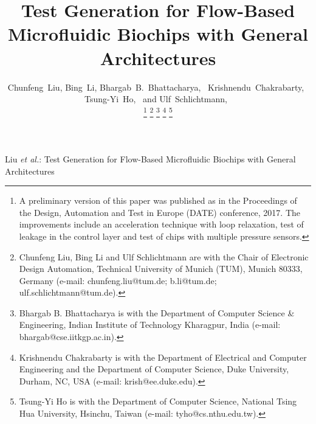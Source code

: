 \documentclass[journal,twoside]{IEEEtran}
\begin{document}
\graphicspath{{Fig/}}
\def\figname{Fig.}
\def\algname{Algorithm}
\newcommand{\figurefontsize}{\footnotesize}
\newcommand{\papertitle}{Test Generation for Flow-Based Microfluidic
Biochips with General Architectures}
\newcommand{\tum}{Technical University of Munich (TUM)}



\title{\papertitle}

\author{	
Chunfeng~Liu, Bing~Li, Bhargab~B.~Bhattacharya,~ Krishnendu~Chakrabarty,~
Tsung-Yi~Ho,~ and Ulf~Schlichtmann,~

\thanks{A preliminary version of this paper was published as \cite{CBBK17} in
the Proceedings of the Design, Automation and Test in Europe (DATE)
conference, 2017. The improvements include an acceleration technique with loop
relaxation, test of leakage in the control layer and test of chips with multiple
pressure sensors.}
          \thanks{Chunfeng Liu, Bing Li and Ulf Schlichtmann are with the Chair
	    of Electronic Design Automation,
          \tum, Munich 80333, Germany (e-mail: chunfeng.liu@tum.de; b.li@tum.de;
  ulf.schlichtmann@tum.de).}
  \thanks{Bhargab B. Bhattacharya is with the
    Department of Computer Science \& Engineering, Indian Institute of
    Technology Kharagpur, India (e-mail: bhargab@cse.iitkgp.ac.in).}
           \thanks{Krishnendu Chakrabarty is with the Department of 
	     Electrical and Computer Engineering and the Department of Computer
	     Science, Duke University, Durham, NC, USA (e-mail: krish@ee.duke.edu).}
            \thanks{Tsung-Yi Ho is with the Department of Computer Science,  
	    National Tsing Hua University, Hsinchu, Taiwan (e-mail: tyho@cs.nthu.edu.tw).}
}

\maketitle
 {Liu \MakeLowercase{\textit{et al.}}: \papertitle}

 
 \IEEEpeerreviewmaketitle
\end{document}
